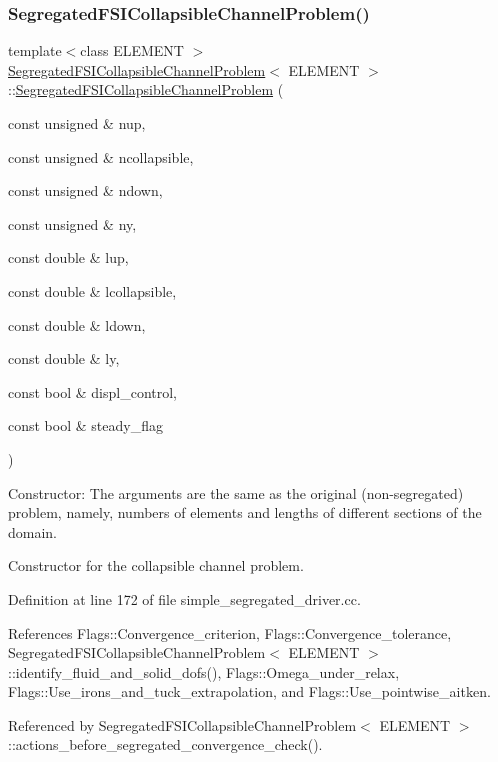 \subsubsection{\texorpdfstring{Segregated\+F\+S\+I\+Collapsible\+Channel\+Problem()}{SegregatedFSICollapsibleChannelProblem()}}
{\footnotesize\ttfamily template$<$class E\+L\+E\+M\+E\+NT $>$ \\
\hyperlink{classSegregatedFSICollapsibleChannelProblem}{Segregated\+F\+S\+I\+Collapsible\+Channel\+Problem}$<$ E\+L\+E\+M\+E\+NT $>$\+::\hyperlink{classSegregatedFSICollapsibleChannelProblem}{Segregated\+F\+S\+I\+Collapsible\+Channel\+Problem} (\begin{DoxyParamCaption}\item[{const unsigned \&}]{nup,  }\item[{const unsigned \&}]{ncollapsible,  }\item[{const unsigned \&}]{ndown,  }\item[{const unsigned \&}]{ny,  }\item[{const double \&}]{lup,  }\item[{const double \&}]{lcollapsible,  }\item[{const double \&}]{ldown,  }\item[{const double \&}]{ly,  }\item[{const bool \&}]{displ\+\_\+control,  }\item[{const bool \&}]{steady\+\_\+flag }\end{DoxyParamCaption})}



Constructor\+: The arguments are the same as the original (non-\/segregated) problem, namely, numbers of elements and lengths of different sections of the domain. 

Constructor for the collapsible channel problem. 

Definition at line 172 of file simple\+\_\+segregated\+\_\+driver.\+cc.



References Flags\+::\+Convergence\+\_\+criterion, Flags\+::\+Convergence\+\_\+tolerance, Segregated\+F\+S\+I\+Collapsible\+Channel\+Problem$<$ E\+L\+E\+M\+E\+N\+T $>$\+::identify\+\_\+fluid\+\_\+and\+\_\+solid\+\_\+dofs(), Flags\+::\+Omega\+\_\+under\+\_\+relax, Flags\+::\+Use\+\_\+irons\+\_\+and\+\_\+tuck\+\_\+extrapolation, and Flags\+::\+Use\+\_\+pointwise\+\_\+aitken.



Referenced by Segregated\+F\+S\+I\+Collapsible\+Channel\+Problem$<$ E\+L\+E\+M\+E\+N\+T $>$\+::actions\+\_\+before\+\_\+segregated\+\_\+convergence\+\_\+check().

